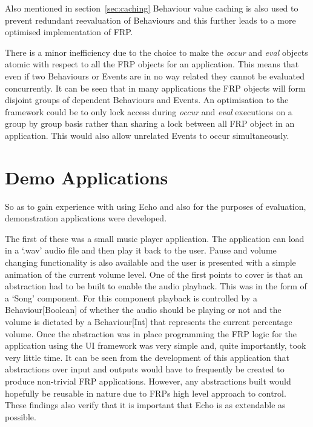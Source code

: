     Also mentioned in section~\ref{sec:caching} Behaviour value caching is also used to prevent redundant reevaluation of Behaviours
    and this further leads to a more optimised implementation of FRP.
    
    There is a minor inefficiency due to the choice to make the \emph{occur} and \emph{eval} objects atomic
    with respect to all the FRP objects for an application. This means that even if two Behaviours or Events are in no way
    related they cannot be evaluated concurrently. It can be seen that in many applications the FRP objects will
    form disjoint groups of dependent Behaviours and Events. An optimisation to the framework could be to
    only lock access during \emph{occur} and \emph{eval} executions on a group by group basis rather than sharing
    a lock between all FRP object in an application. This would also allow unrelated Events to occur simultaneously.
  
  \section{Demo Applications}
    So as to gain experience with using Echo and also for the purposes of evaluation, demonstration
    applications were developed. 
    
    The first of these was a small music player application. The application
    can load in a `.wav' audio file and then play it back to the user. Pause and volume changing functionality
    is also available and the user is presented with a simple animation of the current volume level. One of the
    first points to cover is that an abstraction had to be built to enable the audio playback. This was in the form
    of a `Song' component. For this component playback is controlled by a Behaviour[Boolean] of whether the audio
    should be playing or not and the volume is dictated by a Behaviour[Int] that represents the current percentage
    volume. Once the abstraction was in place programming the FRP logic for the application using the 
    UI framework was very simple and, quite importantly, took very little time. It can be seen from
    the development of this application that abstractions over input and outputs would have to frequently be
    created to produce non-trivial FRP applications. However, any abstractions built would hopefully be
    reusable in nature due to FRPs high level approach to control. These findings also verify that it
    is important that Echo is as extendable as possible.
    
